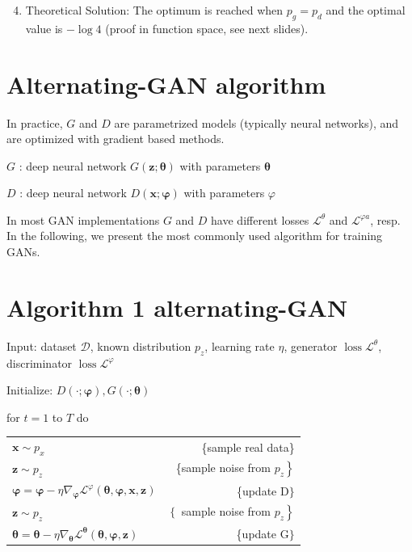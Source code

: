 \documentclass[10pt]{article}
\begin{document}
\begin{enumerate}
  \setcounter{enumi}{3}
  \item Theoretical Solution: The optimum is reached when $p_{g}=p_{d}$ and the optimal value is $-\log 4$ (proof in function space, see next slides).
\end{enumerate}

\section*{Alternating-GAN algorithm}
In practice, $G$ and $D$ are parametrized models (typically neural networks), and are optimized with gradient based methods.

$G$ : deep neural network $G(\mathbf{z} ; \boldsymbol{\theta})$ with parameters $\boldsymbol{\theta}$

$D$ : deep neural network $D(\mathbf{x} ; \boldsymbol{\varphi})$ with parameters $\varphi$

In most GAN implementations $G$ and $D$ have different losses $\mathcal{L}^{\theta}$ and $\mathcal{L}^{\varphi a}$, resp. In the following, we present the most commonly used algorithm for training GANs.

\section*{Algorithm 1 alternating-GAN}
Input: dataset $\mathcal{D}$, known distribution $p_{z}$, learning rate $\eta$, generator $\operatorname{loss} \mathcal{L}^{\theta}$, discriminator $\operatorname{loss} \mathcal{L}^{\varphi}$

Initialize: $D(\cdot ; \boldsymbol{\varphi}), G(\cdot ; \boldsymbol{\theta})$

for $t=1$ to $T$ do

\begin{center}
\begin{tabular}{lr}
$\mathbf{x} \sim p_{x}$ & \{sample real data\} \\
$\mathbf{z} \sim p_{z}$ & \{sample noise from $\left.p_{z}\right\}$ \\
$\boldsymbol{\varphi}=\boldsymbol{\varphi}-\eta \nabla_{\boldsymbol{\varphi}} \mathcal{L}^{\varphi}(\boldsymbol{\theta}, \boldsymbol{\varphi}, \mathbf{x}, \mathbf{z})$ & \{update $\mathrm{D}\}$ \\
$\mathbf{z} \sim p_{z}$ & $\left\{\right.$ sample noise from $\left.p_{z}\right\}$ \\
$\boldsymbol{\theta}=\boldsymbol{\theta}-\eta \nabla_{\boldsymbol{\theta}} \mathcal{L}^{\boldsymbol{\theta}}(\boldsymbol{\theta}, \boldsymbol{\varphi}, \mathbf{z})$ & \{update $\mathrm{G}\}$ \\
\end{tabular}
\end{center}
\end{document}
